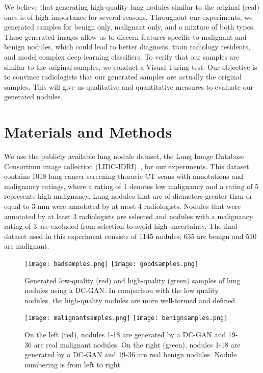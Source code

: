 \documentclass{article}
\begin{document}
We believe that generating high-quality lung nodules similar to the original (real) ones is of high importance for several reasons. Throughout our experiments, we generated samples for benign only, malignant only, and a mixture of both types. These generated images allow us to discern features specific to malignant and benign nodules, which could lead to better diagnosis, train radiology residents, and model complex deep learning classifiers. To verify that our samples are similar to the original samples, we conduct a Visual Turing test. Our objective is to convince radiologists that our generated samples are actually the original samples. This will give us qualitative and quantitative measures to evaluate our generated nodules. 

\section{Materials and Methods}
\label{sec:materials}
We use the publicly available lung nodule dataset, the Lung Image Database Consortium image collection (LIDC-IDRI)~\cite{armato2011lung}, for our experiments. This dataset contains 1018 lung cancer screening thoracic CT scans with annotations and malignancy ratings, where a rating of 1 denotes low malignancy and a rating of 5 represents high malignancy. Lung nodules that are of diameters greater than or equal to 3 mm were annotated by at most 4 radiologists. Nodules that were annotated by at least 3 radiologists are selected and nodules with a malignancy rating of 3 are excluded from selection to avoid high uncertainty. The final dataset used in this experiment consists of 1145 nodules; 635 are benign and 510 are malignant.

\begin{figure*}
\center
\texttt{[image: badsamples.png]}
\texttt{[image: goodsamples.png]}
 \caption{Generated low-quality (red) and high-quality (green) samples of lung nodules using a DC-GAN. In comparison with the low quality nodules, the high-quality nodules are more well-formed and defined.}
 \label{fig:bgsamples}
\end{figure*}

\begin{figure*}
\center
\texttt{[image: malignantsamples.png]}
\texttt{[image: benignsamples.png]}
 \caption{On the left (red), nodules 1-18 are generated by a DC-GAN and 19-36 are real malignant nodules. On the right (green), nodules 1-18 are generated by a DC-GAN and 19-36 are real benign nodules. Nodule numbering is from left to right.}
 \label{fig:classsamples}
\end{figure*}
\end{document}
